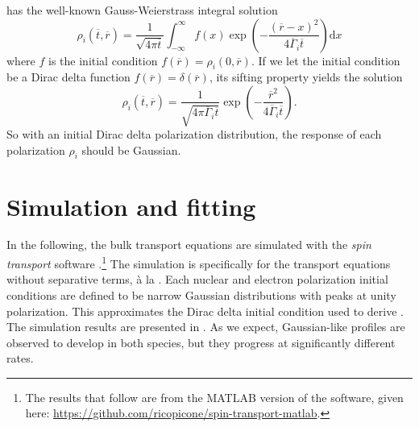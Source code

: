 \documentclass[onecolumn]{amsart}
\begin{document}
 has the well-known Gauss-Weierstrass integral solution \cite{merryfield2009}
\begin{equation}
\label{eq:solution}
\rho_i(\overline{t},\overline{r}) =
\frac{1}{\sqrt{4\pi \overline{t}}}
\int_{-\infty}^\infty f(x) \exp\!\left(-\frac{(\overline{r}-x)^2}{4 \overline{\Gamma}_i \overline{t}}\right) \mathrm{d}x
\end{equation}
where \(f\) is the initial condition \(f(\overline{r}) = \rho_i(0,\overline{r})\).
If we let the initial condition be a Dirac delta function \(f(\overline{r}) = \delta(\overline{r})\), its sifting property yields the solution
\begin{equation}
\label{eq:solution-dirac}
\rho_i(\overline{t},\overline{r}) =
\frac{1}{\sqrt{4\pi \overline{\Gamma}_i \overline{t}}}
\exp\!\left(-\frac{\overline{r}^2}{4 \overline{\Gamma}_i \overline{t}}\right).
\end{equation}
So with an initial Dirac delta polarization distribution, the response of each polarization \(\rho_i\) should be Gaussian.

\section{Simulation and fitting}
\label{sec:org70efa3f}
In the following, the bulk transport equations are simulated with the \emph{spin transport} software \cite{Picone2019}.\footnote{The results that follow are from the MATLAB version of the software, given here: \url{https://github.com/ricopicone/spin-transport-matlab}.}
The simulation is specifically for the transport equations without separative terms, à la .
Each nuclear and electron polarization initial conditions are defined to be narrow Gaussian distributions with peaks at unity polarization.
This approximates the Dirac delta initial condition used to derive .
The simulation results are presented in .
As we expect, Gaussian-like profiles are observed to develop in both species, but they progress at significantly different rates.
\end{document}
